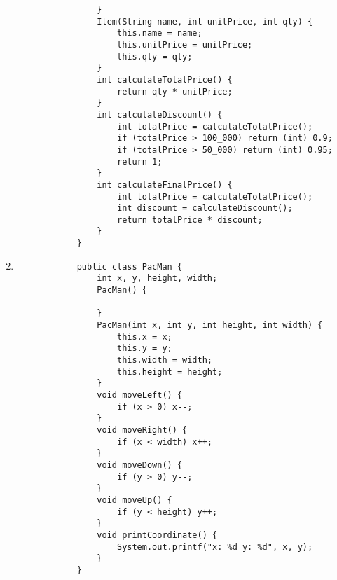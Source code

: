 \documentclass[12pt,titlepage]{article}
\begin{document}
\begin{enumerate}
{\begin{verbatim}
                }
                Item(String name, int unitPrice, int qty) {
                    this.name = name;
                    this.unitPrice = unitPrice;
                    this.qty = qty;
                }
                int calculateTotalPrice() {
                    return qty * unitPrice;
                }
                int calculateDiscount() {
                    int totalPrice = calculateTotalPrice();
                    if (totalPrice > 100_000) return (int) 0.9;
                    if (totalPrice > 50_000) return (int) 0.95;
                    return 1;
                }
                int calculateFinalPrice() {
                    int totalPrice = calculateTotalPrice();
                    int discount = calculateDiscount();
                    return totalPrice * discount;
                }
            }
        \end{verbatim}
    }
    \item  
    {
        \begin{verbatim}
            public class PacMan {
                int x, y, height, width;
                PacMan() {

                }
                PacMan(int x, int y, int height, int width) {
                    this.x = x;
                    this.y = y;
                    this.width = width;
                    this.height = height;
                }
                void moveLeft() {
                    if (x > 0) x--;
                }
                void moveRight() {
                    if (x < width) x++;
                }
                void moveDown() {
                    if (y > 0) y--;
                }
                void moveUp() {
                    if (y < height) y++;
                }
                void printCoordinate() {
                    System.out.printf("x: %d y: %d", x, y);
                }
            }
        \end{verbatim}
    }

\end{enumerate}
\end{document}
